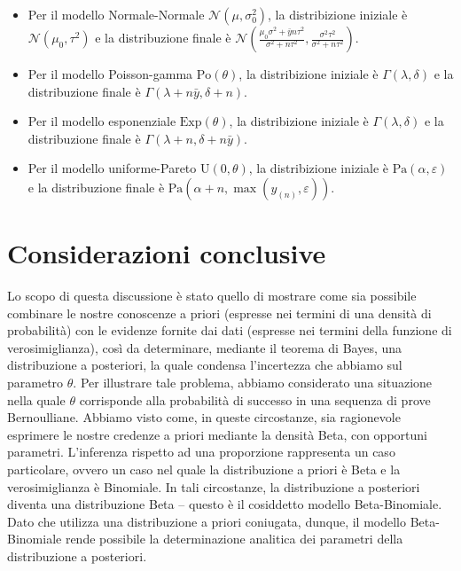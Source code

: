 \documentclass[
  11pt,
  italian,
  a4paper,
  extrafontsizes,onecolumn,openright
  ]{memoir}
\theoremstyle{definition}
\theoremstyle{definition}
\theoremstyle{definition}
\theoremstyle{definition}
\theoremstyle{remark}
\begin{document}
\begin{itemize}
\item
  Per il modello Normale-Normale \(\mathcal{N}(\mu, \sigma^2_0)\), la distribizione iniziale è \(\mathcal{N}(\mu_0, \tau^2)\) e la distribuzione finale è \(\mathcal{N}\left(\frac{\mu_0\sigma^2 + \bar{y}n\tau^2}{\sigma^2 + n\tau^2}, \frac{\sigma^2\tau^2}{\sigma^2 + n\tau^2} \right)\).
\item
  Per il modello Poisson-gamma \(\text{Po}(\theta)\), la distribizione iniziale è \(\Gamma(\lambda, \delta)\) e la distribuzione finale è \(\Gamma(\lambda + n \bar{y}, \delta +n)\).
\item
  Per il modello esponenziale \(\text{Exp}(\theta)\), la distribizione iniziale è \(\Gamma(\lambda, \delta)\) e la distribuzione finale è \(\Gamma(\lambda + n, \delta +n\bar{y})\).
\item
  Per il modello uniforme-Pareto \(\text{U}(0, \theta)\), la distribizione iniziale è \(\text{Pa}(\alpha, \varepsilon)\) e la distribuzione finale è \(\text{Pa}(\alpha + n, \max(y_{(n)}, \varepsilon))\).
\end{itemize}

\hypertarget{considerazioni-conclusive}{%
\section*{Considerazioni conclusive}\label{considerazioni-conclusive}}

Lo scopo di questa discussione è stato quello di mostrare come sia possibile combinare le nostre conoscenze a priori (espresse nei termini di una densità di probabilità) con le evidenze fornite dai dati (espresse nei termini della funzione di verosimiglianza), così da determinare, mediante il teorema di Bayes, una distribuzione a posteriori, la quale condensa l'incertezza che abbiamo sul parametro \(\theta\). Per illustrare tale problema, abbiamo considerato una situazione nella quale \(\theta\) corrisponde alla probabilità di successo in una sequenza di prove Bernoulliane. Abbiamo visto come, in queste circostanze, sia ragionevole esprimere le nostre credenze a priori mediante la densità Beta, con opportuni parametri. L'inferenza rispetto ad una proporzione rappresenta un caso particolare, ovvero un caso nel quale la distribuzione a priori è Beta e la verosimiglianza è Binomiale. In tali circostanze, la distribuzione a posteriori diventa una distribuzione Beta -- questo è il cosiddetto modello Beta-Binomiale. Dato che utilizza una distribuzione a priori coniugata, dunque, il modello Beta-Binomiale rende possibile la determinazione analitica dei parametri della distribuzione a posteriori.
\end{document}
